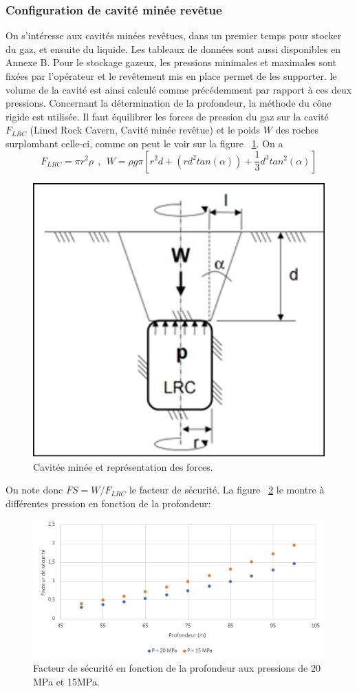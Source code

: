 \documentclass[11pt,french,a4paper]{article}
\begin{document}
\subsubsection{Configuration de cavité minée revêtue}
On s'intéresse aux cavités minées revêtues, dans un premier temps pour stocker du gaz, et ensuite du liquide. Les tableaux de données sont aussi disponibles en Annexe B.
Pour le stockage gazeux, les pressions minimales et maximales sont fixées par l'opérateur et le revêtement mis en place permet de les supporter. le volume de la cavité est ainsi calculé comme précédemment par rapport à ces deux pressions. Concernant la détermination de la profondeur, la méthode du cône rigide est utilisée.
Il faut équilibrer les forces de pression du gaz sur la cavité $F_{LRC}$ (Lined Rock Cavern, Cavité minée revêtue) et le poids $W$ des roches surplombant celle-ci, comme on peut le voir sur la figure ~\ref{fig:chap2schemaContrainteMinee}. On a $$F_{LRC}=\pi r^2 \rho \ \ , \ \ W =\rho g \pi [r^2 d + (r d^2 tan(\alpha)) + \frac{1}{3} d^3 tan^2(\alpha)]$$

\begin{figure}[h!]
\centering
\includegraphics[width=0.4\linewidth]{image/chap2/schema_poids_cavite_minee.png}
\caption{Cavitée minée et représentation des forces.}
\label{fig:chap2schemaContrainteMinee}
\end{figure}

On note donc $FS= W/F_{LRC} $ le facteur de sécurité. La figure ~\ref{fig:chap2graphFS} le montre à différentes pression en fonction de la profondeur: 

\begin{figure}[!h]
\centering
\includegraphics[width=.8\linewidth]{image/chap2/courbe_facteurDeSecu.png}
\caption{Facteur de sécurité en fonction de la profondeur aux pressions de 20 MPa et 15MPa.}
\label{fig:chap2graphFS}
\end{figure}
\end{document}
